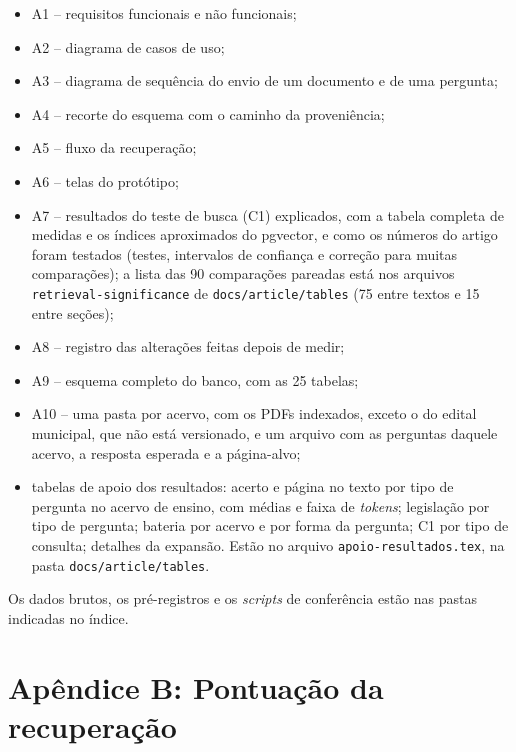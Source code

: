\documentclass[12pt]{article}
\begin{document}
\begin{itemize}
  \item A1 -- requisitos funcionais e não funcionais;
  \item A2 -- diagrama de casos de uso;
  \item A3 -- diagrama de sequência do envio de um documento e de uma pergunta;
  \item A4 -- recorte do esquema com o caminho da proveniência;
  \item A5 -- fluxo da recuperação;
  \item A6 -- telas do protótipo;
  \item A7 -- resultados do teste de busca (C1) explicados, com a tabela completa de medidas e os índices aproximados do pgvector, e como os números do artigo foram testados (testes, intervalos de confiança e correção para muitas comparações); a lista das 90 comparações pareadas está nos arquivos \texttt{retrieval-significance} de \texttt{docs/article/tables} (75 entre textos e 15 entre seções);
  \item A8 -- registro das alterações feitas depois de medir;
  \item A9 -- esquema completo do banco, com as 25 tabelas;
  \item A10 -- uma pasta por acervo, com os PDFs indexados, exceto o do edital municipal, que não está versionado, e um arquivo com as perguntas daquele acervo, a resposta esperada e a página-alvo;
  \item tabelas de apoio dos resultados: acerto e página no texto por tipo de pergunta no acervo de ensino, com médias e faixa de \emph{tokens}; legislação por tipo de pergunta; bateria por acervo e por forma da pergunta; C1 por tipo de consulta; detalhes da expansão. Estão no arquivo \texttt{apoio-resultados.tex}, na pasta \texttt{docs/article/tables}.
\end{itemize}

Os dados brutos, os pré-registros e os \emph{scripts} de conferência estão nas pastas indicadas no índice.

\section*{Apêndice B: Pontuação da recuperação}
\end{document}
